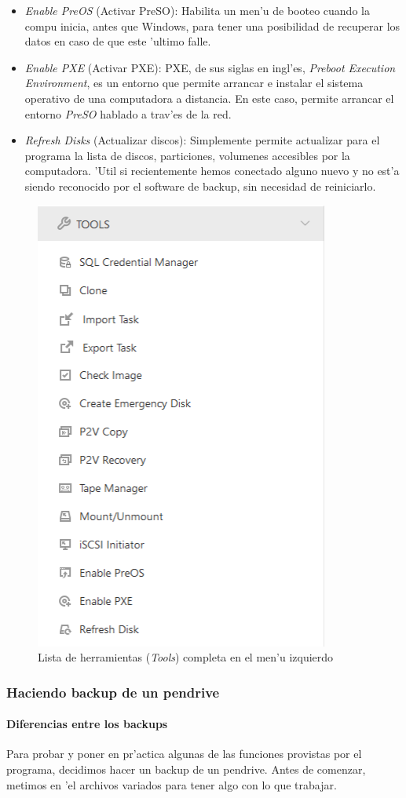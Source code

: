 \documentclass[11pt]{article}
\begin{document}
\begin{itemize}
		\item \textit{Enable PreOS} (Activar PreSO): Habilita un men'u de booteo cuando la compu inicia, antes que Windows, para tener una posibilidad de recuperar los datos en caso de que este 'ultimo falle.
		\item \textit{Enable PXE} (Activar PXE): PXE, de sus siglas en ingl'es, \textit{Preboot Execution Environment}, es un entorno que permite arrancar e instalar el sistema operativo de una computadora a distancia. En este caso, permite arrancar el entorno \textit{PreSO} hablado a trav'es de la red.
		\item \textit{Refresh Disks} (Actualizar discos): Simplemente permite actualizar para el programa la lista de discos, particiones, volumenes accesibles por la computadora. 'Util si recientemente hemos conectado alguno nuevo y no est'a siendo reconocido por el software de backup, sin necesidad de reiniciarlo.
	\end{itemize}
	
	\begin{figure}[H]
		\centering
		\includegraphics[width=.34\textwidth]{Images/easeus/use_tools}
		\caption{Lista de herramientas (\textit{Tools}) completa en el men'u izquierdo}
	\end{figure}
	
	\subsubsection{Haciendo backup de un pendrive}

	\paragraph{Diferencias entre los backups}
    Para probar y poner en pr'actica algunas de las funciones provistas por el programa, decidimos hacer un backup de un pendrive. Antes de comenzar, metimos en 'el archivos variados para tener algo con lo que trabajar.
\end{document}
